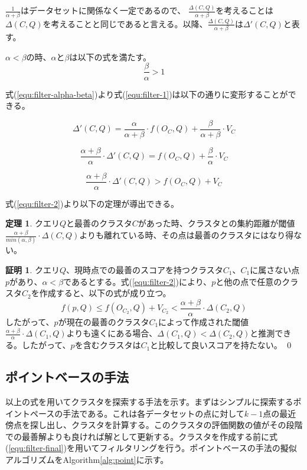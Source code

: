 \documentclass{deimj}
\theoremstyle{definition}
\newtheorem{theorem}{定理}
\newtheorem{Proof}{証明}
\begin{document}
$\frac{1}{\alpha+\beta}$はデータセットに関係なく一定であるので、 $\frac{\Delta(C,Q)}{\alpha+\beta}$を考えることは$\Delta(C,Q)$を考えることと同じであると言える。以降、$\frac{\Delta(C,Q)}{\alpha+\beta}$は$\Delta'(C,Q)$と表す。

$\alpha < \beta$の時、$\alpha$と$\beta$は以下の式を満たす。
\begin{equation}
\label{equ:filter-alpha-beta}
\frac{\beta}{\alpha} > 1
\end{equation}

式(\ref{equ:filter-alpha-beta})より式(\ref{equ:filter-1})は以下の通りに変形することができる。

$$\Delta'(C,Q) = \frac{\alpha}{\alpha+\beta} \cdot f(O_C, Q) + \frac{\beta}{\alpha+\beta} \cdot V_C$$

$$\frac{\alpha+\beta}{\alpha} \cdot \Delta'(C,Q) = f(O_C, Q) + \frac{\beta}{\alpha} \cdot V_C$$

\begin{equation}
\label{equ:filter-2}
\frac{\alpha+\beta}{\alpha} \cdot \Delta'(C,Q) > f(O_C, Q) + V_C
\end{equation}

式(\ref{equ:filter-2})より以下の定理が導出できる。

\begin{theorem}
クエリ$Q$と最善のクラスタ$C$があった時、クラスタとの集約距離が閾値$\frac{\alpha + \beta}{min(\alpha, \beta)} \cdot \Delta(C,Q)$よりも離れている時、その点は最善のクラスタにはなり得ない。
\end{theorem}

\begin{Proof}
クエリ$Q$、現時点での最善のスコアを持つクラスタ$C_1$、$C_1$に属さない点$p$があり、$\alpha < \beta$であるとする。式(\ref{equ:filter-2})により、$p$と他の点で任意のクラスタ$C_2$を作成すると、以下の式が成り立つ。
$$f(p,Q) \leq f(O_{C_2}, Q) + V_{C_2} < \frac{\alpha+\beta}{\alpha} \cdot \Delta(C_2,Q) $$
したがって、$p$が現在の最善のクラスタ$C_1$によって作成された閾値$\frac{\alpha + \beta}{\alpha} \cdot \Delta(C_1,Q)$よりも遠くにある場合、$\Delta(C_1, Q) < \Delta(C_2, Q)$と推測できる。したがって、$p$を含むクラスタは$C_1$と比較して良いスコアを持たない。
\qed
\end{Proof}


\subsection{ポイントベースの手法}
以上の式を用いてクラスタを探索する手法を示す。まずはシンプルに探索するポイントペースの手法である。これは各データセットの点に対して$k-1$点の最近傍点を探し出し、クラスタを計算する。このクラスタの評価関数の値がその段階での最善解よりも良ければ解として更新する。クラスタを作成する前に式(\ref{equ:filter-final})を用いてフィルタリングを行う。ポイントベースの手法の擬似アルゴリズムをAlgorithm\ref{alg:point}に示す。
\end{document}
